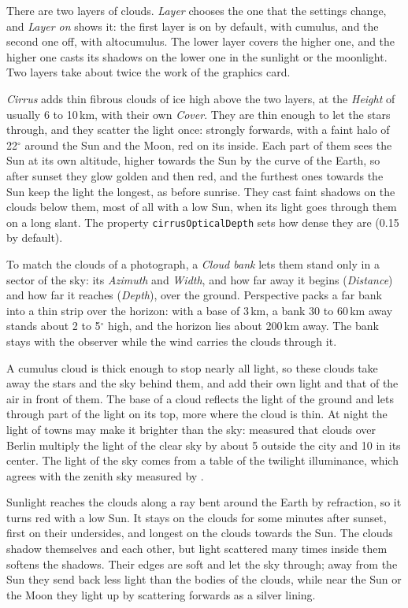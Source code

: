 There are two layers of clouds. \emph{Layer} chooses the one that the
settings change, and \emph{Layer on} shows it: the first layer is on by
default, with cumulus, and the second one off, with altocumulus. The
lower layer covers the higher one, and the higher one casts its shadows
on the lower one in the sunlight or the moonlight. Two layers take about
twice the work of the graphics card.

\emph{Cirrus} adds thin fibrous clouds of ice high above the two layers,
at the \emph{Height} of usually 6 to 10\,km, with their own
\emph{Cover}. They are thin enough to let the stars through, and they
scatter the light once: strongly forwards, with a faint halo of
22$^\circ$ around the Sun and the Moon, red on its inside. Each part of
them sees the Sun at its own altitude, higher towards the Sun by the
curve of the Earth, so after sunset they glow golden and then red, and
the furthest ones towards the Sun keep the light the longest, as before
sunrise. They cast faint shadows on the clouds below them, most of all
with a low Sun, when its light goes through them on a long slant. The
property \texttt{cirrusOpticalDepth} sets how dense they are (0.15 by
default).

To match the clouds of a photograph, a \emph{Cloud bank} lets them stand
only in a sector of the sky: its \emph{Azimuth} and \emph{Width}, and how
far away it begins (\emph{Distance}) and how far it reaches
(\emph{Depth}), over the ground. Perspective packs a far bank into a thin
strip over the horizon: with a base of 3\,km, a bank 30 to 60\,km away
stands about 2 to 5$^\circ$ high, and the horizon lies about 200\,km
away. The bank stays with the observer while the wind carries the clouds
through it.

A cumulus cloud is thick enough to stop nearly all light, so these
clouds take away the stars and the sky behind them, and add their own
light and that of the air in front of them. The base of a cloud reflects
the light of the ground and lets through part of the light on its top,
more where the cloud is thin. At night the light of towns may make it
brighter than the sky: \citet{Kyba:2011:CloudLight} measured that clouds
over Berlin multiply the light of the clear sky by about 5 outside the
city and 10 in its center. The light of the sky comes from a table of
the twilight illuminance, which agrees with the zenith sky measured by
\citet{Patat:2006:Twilight}.

Sunlight reaches the clouds along a ray bent around the Earth by
refraction, so it turns red with a low Sun. It stays on the clouds for
some minutes after sunset, first on their undersides, and longest on the
clouds towards the Sun. The clouds shadow themselves and each other, but
light scattered many times inside them softens the shadows. Their edges
are soft and let the sky through; away from the Sun they send back less
light than the bodies of the clouds, while near the Sun or the Moon they
light up by scattering forwards as a silver lining.

